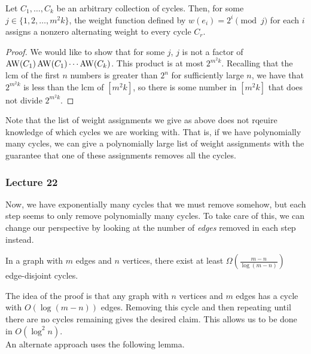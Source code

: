 			\begin{fprop}
				Let $C_1,\ldots,C_k$ be an arbitrary collection of cycles. Then, for some $j \in \{1,2,\ldots,m^2k\}$, the weight function defined by $w(e_i) = 2^i \pmod j$ for each $i$ assigns a nonzero alternating weight to every cycle $C_r$.
			\end{fprop}
			\begin{proof}
				We would like to show that for some $j$, $j$ is not a factor of $\operatorname{AW}(C_1) \operatorname{AW}(C_1) \cdots \operatorname{AW}(C_k)$. This product is at most $2^{m^2k}$. Recalling that the lcm of the first $n$ numbers is greater than $2^n$ for sufficiently large $n$, we have that $2^{m^2k}$ is less than the lcm of $[m^2k]$, so there is some number in $[m^2k]$ that does not divide $2^{m^2k}$.
			\end{proof}

			Note that the list of weight assignments we give as above does not rqeuire knowledge of which cycles we are working with. That is, if we have polynomially many cycles, we can give a polynomially large list of weight assignments with the guarantee that one of these assignments removes all the cycles.


		\subsubsection{Lecture 22}

			Now, we have exponentially many cycles that we must remove somehow, but each step seems to only remove polynomially many cycles. To take care of this, we can change our perspective by looking at the number of \emph{edges} removed in each step instead.

			\begin{flem}
				In a graph with $m$ edges and $n$ vertices, there exist at least $\Omega\left(\frac{m-n}{\log(m-n)}\right)$ edge-disjoint cycles.
			\end{flem}
			The idea of the proof is that any graph with $n$ vertices and $m$ edges has a cycle with $O(\log(m-n))$ edges. Removing this cycle and then repeating until there are no cycles remaining gives the desired claim.
			This allows us to be done in $O(\log^2 n)$.\\
			An alternate approach uses the following lemma.

